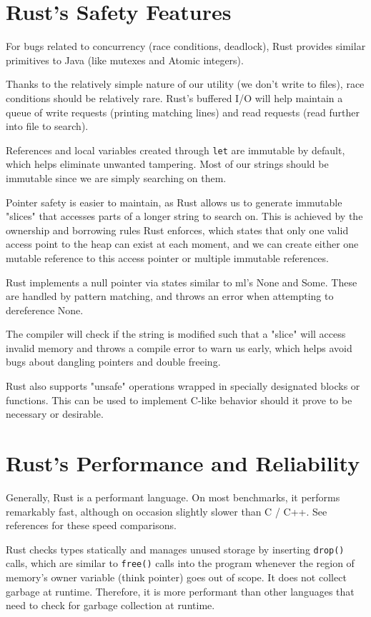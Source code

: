 \section{Rust's Safety Features}
For bugs related to concurrency (race conditions, deadlock), Rust 
provides similar primitives to Java (like mutexes and Atomic integers).

Thanks to the relatively simple nature of our utility (we don't write to
files), race conditions should be relatively rare. Rust's buffered I/O
will help maintain a queue of write requests (printing matching lines)
and read requests (read further into file to search).

References and local variables created through \texttt{let} are immutable
by default, which helps eliminate unwanted tampering. Most of our
strings should be immutable since we are simply searching on them.

Pointer safety is easier to maintain, as Rust allows us to generate 
immutable "slices" that accesses parts of a longer string to search on.
This is achieved by the ownership and borrowing rules Rust enforces,
which states that only one valid access point to the heap can exist at 
each moment, and we can create either one mutable reference to this 
access pointer or multiple immutable references.

Rust implements a null pointer via states similar to ml's 
None and Some. These are handled by pattern matching, and throws
an error when attempting to dereference None.

The compiler will check if the string is modified such that a "slice"
will access invalid memory and throws a compile error to warn us early,
which helps avoid bugs about dangling pointers and double freeing.

Rust also supports "unsafe" operations wrapped in specially 
designated blocks or functions. This can be used to implement 
C-like behavior should it prove to be necessary or desirable.

\section{Rust's Performance and Reliability}
Generally, Rust is a performant language. On most benchmarks, 
it performs remarkably fast, although on occasion slightly 
slower than C / C++. See references for these speed comparisons. 

Rust checks types statically and manages unused storage by 
inserting \texttt{drop()} calls, which are similar to \texttt{free()} calls 
into the program whenever the region of memory's owner variable 
(think pointer) goes  out of scope. It does not collect garbage 
at runtime. Therefore, it is more performant than other 
languages that need to check for garbage collection at runtime.

